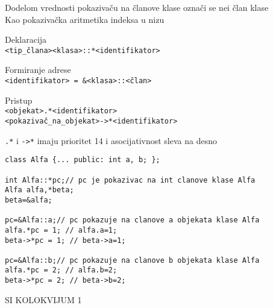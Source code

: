 \documentclass{article}
\newenvironment{xitemize}{%
    
    \itemize
    \larger
}{%
    \enditemize
}
\let\olditemize\itemize
\let\endolditemize\enditemize
\renewenvironment{itemize}{%
    \smaller
    \olditemize
}{%
    \endolditemize
}
\providecommand{\inlinecode}[1]{\texttt{#1}}
\providecommand{\hzline}{\noindent\makebox[\linewidth]{\rule{\paperwidth}{0.4pt}}}
\begin{document}
\begin{xitemize}
\begin{itemize}
    \item Dodelom vrednosti pokazivaču na članove klase označi se nei član klase\\
    Kao pokazivačka aritmetika indeksa u nizu
    \item Deklaracija\\
    \inlinecode{<tip\_člana><klasa>::*<identifikator>}
    \item Formiranje adrese\\
    \inlinecode{<identifikator> = \&<klasa>::<član>}
    \item Pristup\\
    \inlinecode{<objekat>.*<identifikator>}\\
    \inlinecode{<pokazivač\_na\_objekat>->*<identifikator>}
    \item \inlinecode{.*} i \inlinecode{->*} imaju prioritet 14 i asocijativnost sleva na desno
    \begin{lstlisting}
class Alfa {... public: int a, b; };

int Alfa::*pc;// pc je pokazivac na int clanove klase Alfa
Alfa alfa,*beta;
beta=&alfa;

pc=&Alfa::a;// pc pokazuje na clanove a objekata klase Alfa
alfa.*pc = 1; // alfa.a=1;
beta->*pc = 1; // beta->a=1;

pc=&Alfa::b;// pc pokazuje na clanove b objekata klase Alfa
alfa.*pc = 2; // alfa.b=2;
beta->*pc = 2; // beta->b=2;
    \end{lstlisting}
\end{itemize}

\end{xitemize}
\begin{center}
    SI KOLOKVIJUM 1
    \hzline
\end{center}
\end{document}
